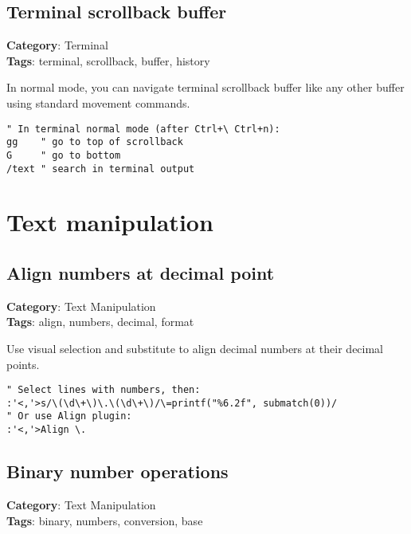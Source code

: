 {{{{{{{{{{{{{{\section{Terminal scrollback buffer}

\textbf{Category}: Terminal\\ \textbf{Tags}: terminal, scrollback, buffer, history
\vspace{0.5cm}

In normal mode, you can navigate terminal scrollback buffer like any other buffer using standard movement commands.

\begin{Exa*}{}
\begin{Verbatim}[fontsize=\footnotesize, breaklines, breakanywhere]
" In terminal normal mode (after Ctrl+\ Ctrl+n):
gg    " go to top of scrollback
G     " go to bottom  
/text " search in terminal output
\end{Verbatim}
\end{Exa*}

\chapter{Text manipulation}
\section{Align numbers at decimal point}

\textbf{Category}: Text Manipulation\\ \textbf{Tags}: align, numbers, decimal, format
\vspace{0.5cm}

Use visual selection and substitute to align decimal numbers at their decimal points.

\begin{Exa*}{}
\begin{Verbatim}[fontsize=\footnotesize, breaklines, breakanywhere]
" Select lines with numbers, then:
:'<,'>s/\(\d\+\)\.\(\d\+\)/\=printf("%6.2f", submatch(0))/
" Or use Align plugin:
:'<,'>Align \.
\end{Verbatim}
\end{Exa*}

\section{Binary number operations}

\textbf{Category}: Text Manipulation\\ \textbf{Tags}: binary, numbers, conversion, base
\vspace{0.5cm}

}}}}}}}}}}}}}}
